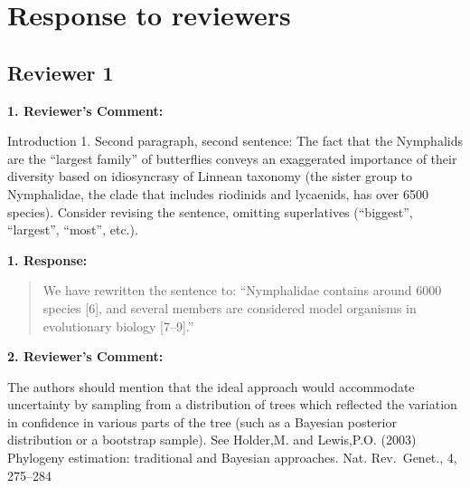 \documentclass[]{article}
\date{}
\begin{document}
\section{Response to reviewers}\label{response-to-reviewers}

\subsection{Reviewer 1}\label{reviewer-1}

\textbf{1. Reviewer's Comment:}

Introduction 1. Second paragraph, second sentence: The fact that the
Nymphalids are the ``largest family'' of butterflies conveys an
exaggerated importance of their diversity based on idiosyncrasy of
Linnean taxonomy (the sister group to Nymphalidae, the clade that
includes riodinids and lycaenids, has over 6500 species). Consider
revising the sentence, omitting superlatives (``biggest'', ``largest'',
``most'', etc.).

\textbf{1. Response:}

\begin{quote}
\color{blue}
We have rewritten the sentence to: ``Nymphalidae contains around 6000
species {[}6{]}, and several members are considered model organisms in
evolutionary biology {[}7--9{]}.''
\end{quote}

\textbf{2. Reviewer's Comment:}

The authors should mention that the ideal approach would accommodate
uncertainty by sampling from a distribution of trees which reflected the
variation in confidence in various parts of the tree (such as a Bayesian
posterior distribution or a bootstrap sample). See Holder,M. and
Lewis,P.O. (2003) Phylogeny estimation: traditional and Bayesian
approaches. Nat. Rev.~Genet., 4, 275--284
\end{document}
